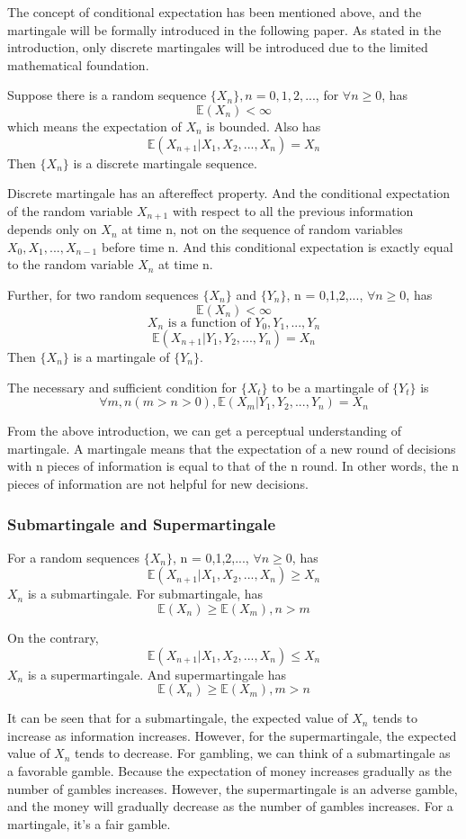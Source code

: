 \documentclass[11pt]{article} %
\begin{document}
The concept of conditional expectation has been mentioned above, and the martingale will be formally introduced in the following paper. As stated in the introduction, only discrete martingales will be introduced due to the limited mathematical foundation.

Suppose there is a random sequence $\{X_n\}, n =0,1,2,...$, for $\forall n \geq 0$, has
$$
	\mathbb E(X_n) < \infty
$$
which means the expectation of $X_n$ is bounded. Also has
$$
	\mathbb E(X_{n+1}|X_1,X_2,...,X_n) = X_n
$$
Then $\{X_n\}$ is a discrete martingale sequence.

Discrete martingale has an aftereffect property. And the conditional expectation of the random variable $X_{n+1}$ with respect to all the previous information depends only on $X_n$ at time n, not on the sequence of random variables $X_0,X_1,...,X_{n-1}$ before time n. And this conditional expectation is exactly equal to the random variable $X_n$ at time n.

Further, for two random sequences $\{X_n\}$ and $\{Y_n\}$, n = 0,1,2,..., $\forall n \geq 0$, has
$$
	\mathbb E(X_n) < \infty
$$
$$
	X_n \text{ is a function of } Y_0,Y_1,...,Y_n
$$
$$
	\mathbb E(X_{n+1}|Y_1,Y_2,...,Y_n) = X_n
$$
Then $\{X_n\}$ is a martingale of $\{Y_n\}$.

The necessary and sufficient condition for $\{X_t\}$ to be a martingale of $\{Y_t\}$ is
$$
	\forall m,n(m>n>0),\mathbb E(X_m|Y_1,Y_2,...,Y_n) = X_n
$$

From the above introduction, we can get a perceptual understanding of martingale. A martingale means that the expectation of a new round of decisions with n pieces of information is equal to that of the n round. In other words, the n pieces of information are not helpful for new decisions.
\subsubsection{Submartingale and Supermartingale}

For a random sequences $\{X_n\}$, n = 0,1,2,..., $\forall n \geq 0$, has
$$
	\mathbb E(X_{n+1}|X_1,X_2,...,X_n) \geq X_n
$$
$X_n$ is a submartingale. For submartingale, has
$$
\mathbb E(X_n) \geq \mathbb E(X_m),n>m
$$

On the contrary,
$$
	\mathbb E(X_{n+1}|X_1,X_2,...,X_n) \leq X_n
$$
$X_n$ is a supermartingale. And supermartingale has
$$
\mathbb E(X_n) \geq \mathbb E(X_m),m>n
$$
 
It can be seen that for a submartingale, the expected value of $X_n$ tends to increase as information increases. However, for the supermartingale, the expected value of $X_n$ tends to decrease. For gambling, we can think of a submartingale as a favorable gamble. Because the expectation of money increases gradually as the number of gambles increases. However, the supermartingale is an adverse gamble, and the money will gradually decrease as the number of gambles increases. For a martingale, it's a fair gamble.
\end{document}
